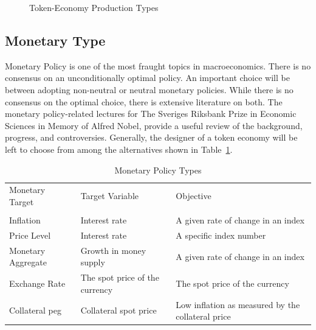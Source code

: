 \documentclass[11pt]{article}
\begin{document}
\begin{figure}[h!]
\caption{Token-Economy Production Types} \label{fig:tept}
\end{figure}

\subsection{Monetary Type}
Monetary Policy is one of the most fraught topics in macroeconomics. There is no consensus on an unconditionally optimal policy. An important choice will be between adopting non-neutral or neutral monetary policies. While there is no consensus on the optimal choice, there is extensive literature on both. The monetary policy-related lectures for The Sveriges Riksbank Prize in Economic Sciences in Memory of Alfred Nobel\autocite{nobel}, provide a useful review of the background, progress, and controversies. Generally, the designer of a token economy will be left to choose from among the alternatives shown in Table~\ref{tbl:mpt}.

\begin{table}[!h]
\caption{Monetary Policy Types} %
\small
\centering %
\begin{tabular}{l l l} %
\hline\hline %
Monetary Target & Target Variable & Objective \\ [0.5ex]
\\ [0.5ex]
\hline %
Inflation & Interest rate & A given rate of change in an index \\
Price Level & Interest rate & A specific index number \\
Monetary Aggregate & Growth in money supply & A given rate of change in an index \\ 
Exchange Rate & The spot price of the currency & The spot price of the currency \\ 
Collateral peg & Collateral spot price & Low inflation as measured by the collateral price \\ 
\hline %

\end{tabular}
\label{tbl:mpt}
\end{table}
\end{document}
